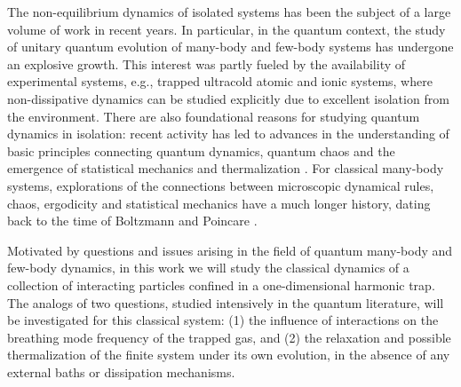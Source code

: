 \documentclass[a4paper, onecolumn]{revtex4-1}
\begin{document}
The non-equilibrium dynamics of isolated systems has been the subject of a large volume of work in
recent years.  In particular, in the quantum context, the study of unitary quantum evolution of
many-body and few-body systems has undergone an explosive growth.  This interest was partly fueled
by the availability of experimental systems, e.g., trapped ultracold atomic and ionic systems, where
non-dissipative dynamics can be studied explicitly due to excellent isolation from the environment.
There are also foundational reasons for studying quantum dynamics in isolation: recent activity has
led to advances in the understanding of basic principles connecting quantum dynamics, quantum chaos
and the emergence of statistical mechanics and thermalization \cite{PolkovnikovRigol_AdvPhys2016,
  BorgonoviIzrailevSantos_PhysRep2016}.  For classical many-body systems, explorations of the
connections between microscopic dynamical rules, chaos, ergodicity and statistical mechanics have a
much longer history, dating back to the time of Boltzmann and Poincare \cite{Gaspard_book_1998,
  Dorfman_book_1999, Dumas_book_KAMstory, Boltzmann_legacy_book, EckmannRuelle_RMP85,
  Gaspard_PhysicaA06}.

Motivated by questions and issues arising in the field of quantum many-body and few-body dynamics,
in this work we will study the classical dynamics of a collection of interacting particles confined
in a one-dimensional harmonic trap.  The analogs of two questions, studied intensively in the
quantum literature, will be investigated for this classical system: (1) the influence of
interactions on the breathing mode frequency of the trapped gas, and (2) the relaxation and possible
thermalization of the finite system under its own evolution, in the absence of any external baths or
dissipation mechanisms.
\end{document}
